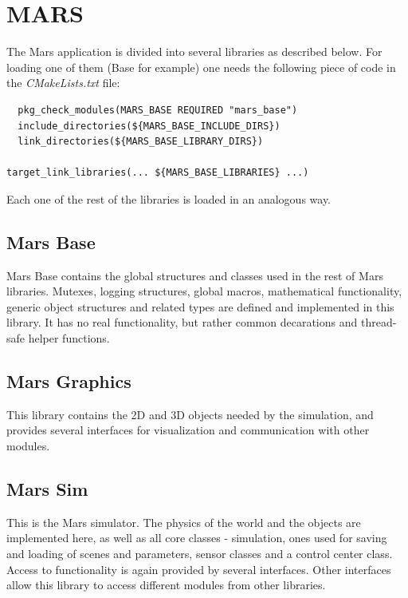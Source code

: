 \documentclass{article}
\begin{document}
\section{MARS}

The Mars application is divided into several libraries as described below. 
For loading one of them (Base for example) one needs the following piece of code in the \emph{CMakeLists.txt} file:

\begin{lstlisting}
  pkg_check_modules(MARS_BASE REQUIRED "mars_base")
  include_directories(${MARS_BASE_INCLUDE_DIRS})
  link_directories(${MARS_BASE_LIBRARY_DIRS})

target_link_libraries(... ${MARS_BASE_LIBRARIES} ...)
\end{lstlisting}

Each one of the rest of the libraries is loaded in an analogous way.


\subsection{Mars Base}

Mars Base contains the global structures and classes used in the rest of Mars libraries. Mutexes, logging 
structures, global macros, mathematical functionality, generic object structures and related types are defined
and implemented in this library. It has no real functionality, but rather common decarations and thread-safe
helper functions.
  

\subsection{Mars Graphics}

This library contains the 2D and 3D objects needed by the simulation, and provides several interfaces for
visualization and communication with other modules.  


\subsection{Mars Sim}

This is the Mars simulator. The physics of the world and the objects are implemented here, as well as all core 
classes - simulation, ones used for saving and loading of scenes and parameters, sensor classes and a control
center class. Access to functionality is again provided by several interfaces. Other interfaces allow this library
to access different modules from other libraries.
\end{document}
